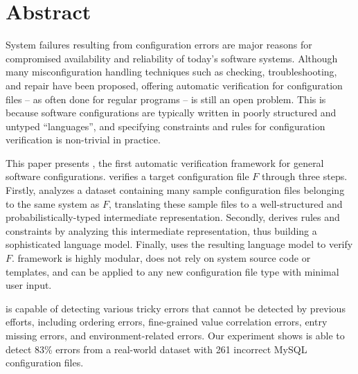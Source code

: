 
\section*{Abstract}

System failures resulting from configuration errors 
are major reasons for compromised availability and
reliability of today's software systems.
Although many misconfiguration handling techniques
such as checking, troubleshooting, and repair
have been proposed, 
offering automatic verification for configuration files -- as often  
done for regular programs -- is still an open problem.
This is because software configurations are typically written in
poorly structured and untyped ``languages'', and 
specifying constraints and rules for configuration 
verification is non-trivial in practice.

This paper presents \app, the first automatic verification framework for
general software configurations.
\app verifies a target configuration file $F$ through three steps.
Firstly, \app analyzes a dataset containing many sample configuration 
files belonging to the same system as $F$,
translating these sample files to a
well-structured and probabilistically-typed 
intermediate representation.
Secondly, \app derives rules and constraints by analyzing
this intermediate representation, thus building a
sophisticated language model.
Finally, \app uses the resulting language model to verify $F$.
\app framework is highly modular, 
does not rely on system source code or templates, and
can be applied to any new configuration file type with minimal user input. 

\app is capable of detecting various tricky errors that cannot
be detected by previous efforts,
including ordering errors, fine-grained value correlation errors, 
entry missing errors, and environment-related errors. 
Our experiment shows \app is able to detect 83\% errors from
a real-world dataset with 261 incorrect MySQL configuration files.

